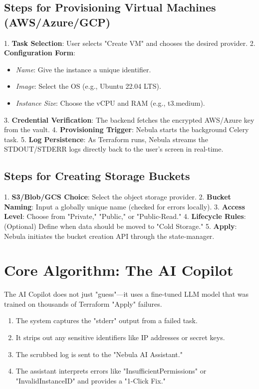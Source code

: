 \subsection{Steps for Provisioning Virtual Machines (AWS/Azure/GCP)}
1. \textbf{Task Selection}: User selects "Create VM" and chooses the desired provider.
2. \textbf{Configuration Form}: 
    \begin{itemize}
        \item \textit{Name}: Give the instance a unique identifier.
        \item \textit{Image}: Select the OS (e.g., Ubuntu 22.04 LTS).
        \item \textit{Instance Size}: Choose the vCPU and RAM (e.g., t3.medium).
    \end{itemize}
3. \textbf{Credential Verification}: The backend fetches the encrypted AWS/Azure key from the vault.
4. \textbf{Provisioning Trigger}: Nebula starts the background Celery task.
5. \textbf{Log Persistence}: As Terraform runs, Nebula streams the STDOUT/STDERR logs directly back to the user's screen in real-time.

\subsection{Steps for Creating Storage Buckets}
1. \textbf{S3/Blob/GCS Choice}: Select the object storage provider.
2. \textbf{Bucket Naming}: Input a globally unique name (checked for errors locally).
3. \textbf{Access Level}: Choose from "Private," "Public," or "Public-Read."
4. \textbf{Lifecycle Rules}: (Optional) Define when data should be moved to "Cold Storage."
5. \textbf{Apply}: Nebula initiates the bucket creation API through the state-manager.

\section{Core Algorithm: The AI Copilot}
The AI Copilot does not just "guess"—it uses a fine-tuned LLM model that was trained on thousands of Terraform "Apply" failures. 
\begin{enumerate}
    \item The system captures the "stderr" output from a failed task.
    \item It strips out any sensitive identifiers like IP addresses or secret keys.
    \item The scrubbed log is sent to the "Nebula AI Assistant."
    \item The assistant interprets errors like "InsufficientPermissions" or "InvalidInstanceID" and provides a "1-Click Fix."
\end{enumerate}

\newpage
